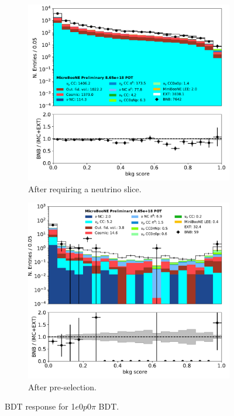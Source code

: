 \documentclass[a4paper]{article}
\newcommand{\zpsel}{1$e$0$p$0$\pi$ }
\begin{document}
\begin{figure}[H] 
\begin{center}
    \begin{subfigure}[b]{0.45\textwidth}
    \centering
    \includegraphics[width=1.00\textwidth]{1e0p/bkg_score_01162020_RUN3_nslice.pdf}
    \caption{\label{fig:1e0p:bdt:bkgscore:slice} After requiring a neutrino slice.}
    \end{subfigure}
    \begin{subfigure}[b]{0.45\textwidth}
    \centering
    \includegraphics[width=1.00\textwidth]{1e0p/bkg_score_01162020_RUN3_presel.pdf}
    \caption{\label{fig:1e0p:bdt:bkgscore:presel} After pre-selection.}
    \end{subfigure}
\caption{\label{fig:1e0p:bdt:bkgscore} BDT response for \zpsel BDT.}
\end{center}
\end{figure}
\end{document}
